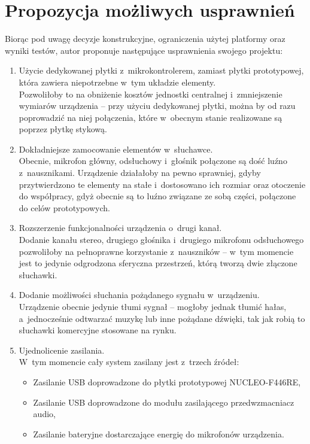 \section{Propozycja możliwych usprawnień}
Biorąc pod uwagę decyzje konstrukcyjne, ograniczenia użytej platformy oraz wyniki testów, autor proponuje następujące usprawnienia swojego projektu:
\begin{enumerate}
	\item Użycie dedykowanej płytki z~mikrokontrolerem, zamiast płytki prototypowej, która zawiera niepotrzebne w~tym układzie elementy.\\
	Pozwoliłoby to na obniżenie kosztów jednostki centralnej i~zmniejszenie wymiarów urządzenia -- przy użyciu dedykowanej płytki, można by od razu poprowadzić na niej połączenia, które w~obecnym stanie realizowane są poprzez płytkę stykową.
	\item Dokładniejsze zamocowanie elementów w~słuchawce.\\
	Obecnie, mikrofon główny, odsłuchowy i~głośnik połączone są dość luźno z~nausznikami. Urządzenie działałoby na pewno sprawniej, gdyby przytwierdzono te elementy na stałe i~dostosowano ich rozmiar oraz otoczenie do współpracy, gdyż obecnie są to luźno związane ze sobą części, połączone do celów prototypowych.
	\item Rozszerzenie funkcjonalności urządzenia o~drugi kanał.\\
	Dodanie kanału stereo, drugiego głośnika i~drugiego mikrofonu odsłuchowego pozwoliłoby na pełnoprawne korzystanie z~nauszników -- w~tym momencie jest to jedynie odgrodzona sferyczna przestrzeń, którą tworzą dwie złączone słuchawki.
	\item Dodanie możliwości słuchania pożądanego sygnału w~urządzeniu.\\
	Urządzenie obecnie jedynie tłumi sygnał -- mogłoby jednak tłumić hałas, a~jednocześnie odtwarzać muzykę lub inne pożądane dźwięki, tak jak robią to słuchawki komercyjne stosowane na rynku.
	\item Ujednolicenie zasilania.\\
	W~tym momencie cały system zasilany jest z~trzech źródeł:
	\begin{itemize}
	\item Zasilanie USB doprowadzone do płytki prototypowej NUCLEO-F446RE,
	\item Zasilanie USB doprowadzone do modułu zasilającego przedwzmacniacz audio,
	\item Zasilanie bateryjne dostarczające energię do mikrofonów urządzenia.

\end{itemize}
\end{enumerate}

